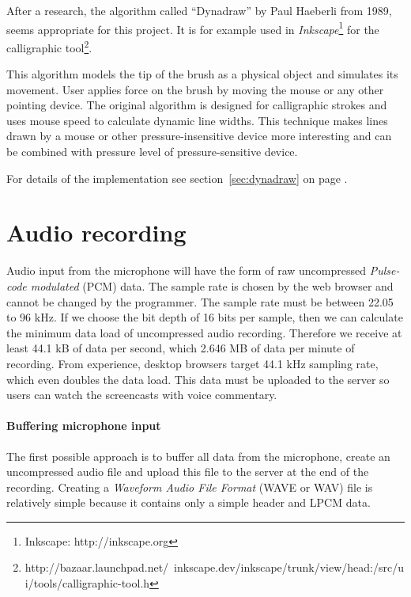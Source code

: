 After a research, the algorithm called ``Dynadraw'' by Paul Haeberli \cite{dyna_draw} from 1989, seems appropriate for this project. It is for example used in \textit{Inkscape}\footnote{Inkscape: http://inkscape.org} for the calligraphic tool\footnote{http://bazaar.launchpad.net/~inkscape.dev/inkscape/trunk/view/head:/src/ui/tools/calligraphic-tool.h}.

This algorithm models the tip of the brush as a physical object and simulates its movement. User applies force on the brush by moving the mouse or any other pointing device. The original algorithm is designed for calligraphic strokes and uses mouse speed to calculate dynamic line widths. This technique makes lines drawn by a mouse or other pressure-insensitive device more interesting and can be combined with pressure level of pressure-sensitive device.

For details of the implementation see section~\ref{sec:dynadraw} on page \pageref{sec:dynadraw}.








\section{Audio recording}
Audio input from the microphone will have the form of raw uncompressed \textit{Pulse-code modulated} (PCM) data\cite{mic_pcm}. The sample rate is chosen by the web browser and cannot be changed by the programmer. The sample rate must be between 22.05 to 96 kHz. If we choose the bit depth of 16 bits per sample, then we can calculate the minimum data load of uncompressed audio recording. Therefore we receive at least 44.1 kB of data per second, which 2.646 MB of data per minute of recording. From experience, desktop browsers target 44.1 kHz sampling rate, which even doubles the data load. This data must be uploaded to the server so users can watch the screencasts with voice commentary.

\paragraph{Buffering microphone input} The first possible approach is to buffer all data from the microphone, create an uncompressed audio file and upload this file to the server at the end of the recording. Creating a \textit{Waveform Audio File Format} (WAVE or WAV) file is relatively simple because it contains only a simple header and LPCM data.

